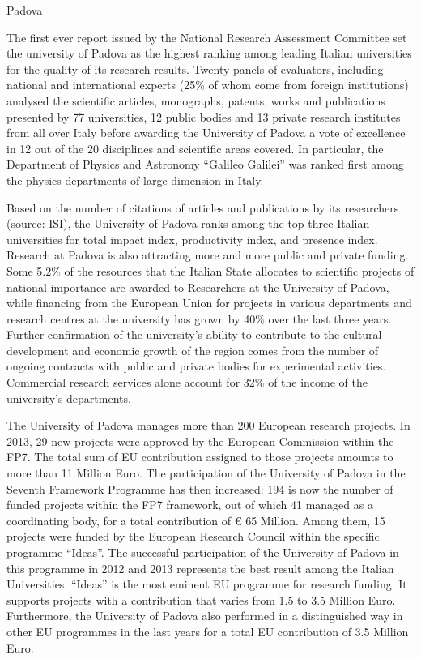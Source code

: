 \begin{sitedescription}{Padova} \label{desc:Padova}

The first ever report issued by the National Research Assessment Committee set the university of Padova as the highest ranking among leading Italian universities for the quality of its research results.
Twenty panels of evaluators, including national and international experts (25\% of whom come from foreign institutions) analysed the scientific articles, monographs, patents, works and publications presented by 77 universities, 12 public bodies and 13 private research institutes from all over Italy before awarding the University of Padova a vote of excellence in 12 out of the 20 disciplines and scientific areas covered.
In particular, the Department of Physics and Astronomy ``Galileo Galilei'' was ranked first among the physics departments of large dimension in Italy.

Based on the number of citations of articles and publications by its researchers (source: ISI), the University of Padova ranks among the top three Italian universities for total impact index, productivity index, and presence index.
Research at Padova is also attracting more and more public and private funding. Some 5.2\% of the resources that the Italian State allocates to scientific projects of national importance are awarded to Researchers at the University of Padova, while financing from the European Union for projects in various departments and research centres at the university has grown by 40\% over the last three years.
Further confirmation of the university’s ability to contribute to the cultural development and economic growth of the region comes from the number of ongoing contracts with public and private bodies for experimental activities. Commercial research services alone account for 32\% of the income of the university’s departments.

The University of Padova manages more than 200 European research projects. In 2013, 29 new projects were approved by the European Commission within the FP7. The total sum of EU contribution assigned to those projects amounts to more than 11 Million Euro.
The participation of the University of Padova in the Seventh Framework Programme has then increased: 194 is now the number of funded projects within the FP7 framework, out of which 41 managed as a coordinating body, for a total contribution of € 65 Million. Among them, 15 projects were funded by the European Research Council within the specific programme “Ideas”.
The successful participation of the University of Padova in this programme in 2012 and 2013 represents the best result among the Italian Universities. “Ideas” is the most eminent EU programme for research funding. It supports projects with a contribution that varies from 1.5 to 3.5 Million Euro. Furthermore, the University of Padova also performed in a distinguished way in other EU programmes in the last years for a total EU contribution of 3.5 Million Euro.



\end{sitedescription}
